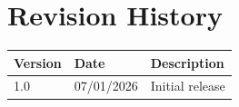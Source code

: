 \setcounter{page}{1}

\chapter*{Revision History}
\begin{table}[H]
\centering
\begin{tabular}{|l|l|p{8cm}|}
\hline
\textbf{Version} & \textbf{Date} & \textbf{Description} \\ \hline
1.0 & 07/01/2026 & Initial release \\ \hline
\end{tabular}
\end{table}

\tableofcontents
\thispagestyle{empty}
\cleardoublepage

\listoffigures
\listoftables
